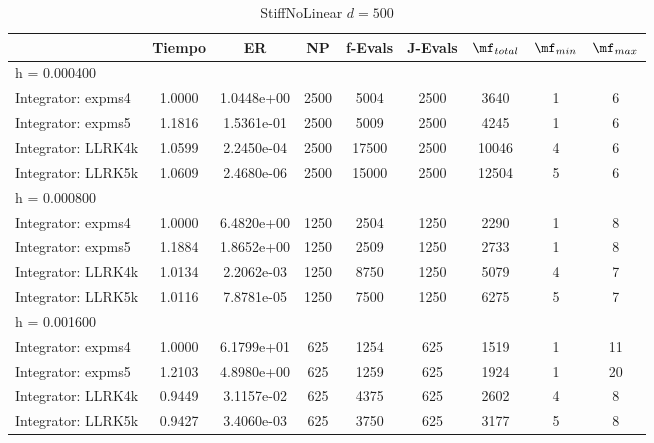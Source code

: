 \begin{table}[htb]
	\centering
\begin{tabular}{l|c|c|c|c|c|c|c|c}
\hline
& Tiempo & ER & NP & f-Evals & J-Evals & $\mf_{total}$ & $\mf_{min}$ & $\mf_{max}$ \\
\hline h = 0.000400 &  &  &  &  &  &  &  &  \\
 Integrator: expms4 & 1.0000 & 1.0448e+00 & 2500 & 5004 & 2500 & 3640 & 1 & 6  \\
Integrator: expms5 & 1.1816 & 1.5361e-01 & 2500 & 5009 & 2500 & 4245 & 1 & 6  \\
Integrator: LLRK4k & 1.0599 & 2.2450e-04 & 2500 & 17500 & 2500 & 10046 & 4 & 6  \\
Integrator: LLRK5k & 1.0609 & 2.4680e-06 & 2500 & 15000 & 2500 & 12504 & 5 & 6  \\
\hline
\hline h = 0.000800 &  &  &  &  &  &  &  &  \\
 Integrator: expms4 & 1.0000 & 6.4820e+00 & 1250 & 2504 & 1250 & 2290 & 1 & 8  \\
Integrator: expms5 & 1.1884 & 1.8652e+00 & 1250 & 2509 & 1250 & 2733 & 1 & 8  \\
Integrator: LLRK4k & 1.0134 & 2.2062e-03 & 1250 & 8750 & 1250 & 5079 & 4 & 7  \\
Integrator: LLRK5k & 1.0116 & 7.8781e-05 & 1250 & 7500 & 1250 & 6275 & 5 & 7  \\
\hline
\hline h = 0.001600 &  &  &  &  &  &  &  &  \\
 Integrator: expms4 & 1.0000 & 6.1799e+01 & 625 & 1254 & 625 & 1519 & 1 & 11  \\
Integrator: expms5 & 1.2103 & 4.8980e+00 & 625 & 1259 & 625 & 1924 & 1 & 20  \\
Integrator: LLRK4k & 0.9449 & 3.1157e-02 & 625 & 4375 & 625 & 2602 & 4 & 8  \\
Integrator: LLRK5k & 0.9427 & 3.4060e-03 & 625 & 3750 & 625 & 3177 & 5 & 8  \\
\hline
\end{tabular}
\caption{StiffNoLinear $d=500$}
\end{table}
